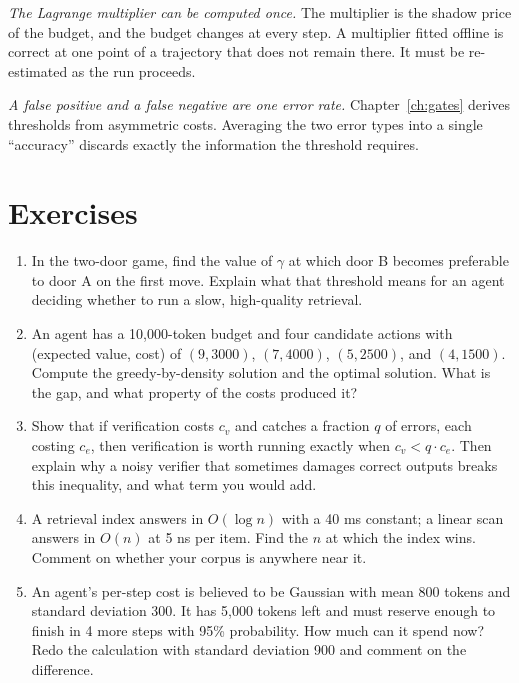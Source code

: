 \documentclass[11pt]{book}
\begin{document}
\textit{The Lagrange multiplier can be computed once.} The multiplier is the shadow price of the budget, and the budget changes at every step. A multiplier fitted offline is correct at one point of a trajectory that does not remain there. It must be re-estimated as the run proceeds.

\textit{A false positive and a false negative are one error rate.} Chapter~\ref{ch:gates} derives thresholds from asymmetric costs. Averaging the two error types into a single ``accuracy'' discards exactly the information the threshold requires.

\section*{Exercises}

\begin{enumerate}
\item In the two-door game, find the value of $\gamma$ at which door B becomes preferable to door A on the first move. Explain what that threshold means for an agent deciding whether to run a slow, high-quality retrieval.

\item An agent has a 10{,}000-token budget and four candidate actions with (expected value, cost) of $(9, 3000)$, $(7, 4000)$, $(5, 2500)$, and $(4, 1500)$. Compute the greedy-by-density solution and the optimal solution. What is the gap, and what property of the costs produced it?

\item Show that if verification costs $c_v$ and catches a fraction $q$ of errors, each costing $c_e$, then verification is worth running exactly when $c_v < q \cdot c_e$. Then explain why a noisy verifier that sometimes damages correct outputs breaks this inequality, and what term you would add.

\item A retrieval index answers in $O(\log n)$ with a 40 ms constant; a linear scan answers in $O(n)$ at 5 ns per item. Find the $n$ at which the index wins. Comment on whether your corpus is anywhere near it.

\item An agent's per-step cost is believed to be Gaussian with mean 800 tokens and standard deviation 300. It has 5{,}000 tokens left and must reserve enough to finish in 4 more steps with 95\% probability. How much can it spend now? Redo the calculation with standard deviation 900 and comment on the difference.
\end{enumerate}
\end{document}
